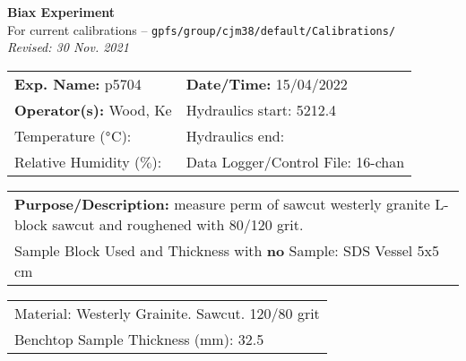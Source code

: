\documentclass[letterpaper, 10pt]{article}
\begin{document}
\begin{center}
    {\Large \textbf{Biax Experiment}}\\
    {\small For current calibrations -- \texttt{gpfs/group/cjm38/default/Calibrations/}}\\
    {\footnotesize \textit{Revised: 30 Nov. 2021}}
\end{center}



\begin{table}[!ht]
	\renewcommand{\arraystretch}{1.1}
	\begin{tabular}{p{10cm} p{10cm} }
	    \textbf{Exp. Name: }p5704 & \textbf{Date/Time: }15/04/2022\\
	    \textbf{Operator(s): }Wood, Ke & Hydraulics start: 5212.4 \\
	    Temperature ($\degree$C):  & Hydraulics end:  \\
	    Relative Humidity ($\%$):  & Data Logger/Control File: 16-chan \\
	\end{tabular}
\end{table} 
\vspace{-0.5cm} 

\begin{table}[!ht]
	\renewcommand{\arraystretch}{1.1}
	\begin{tabular}{p{20cm}}\textbf{Purpose/Description:} measure perm of sawcut westerly granite L-block sawcut and roughened with 80/120 grit.  \\Sample Block Used and Thickness with \textbf{no} Sample: SDS Vessel 5x5 cm \\
	\end{tabular}
    \end{table} \vspace{-0.5cm} 

\begin{table}[!ht]
        \small
        \renewcommand{\arraystretch}{1.2}
        \begin{tabular}{ |p{7cm}| } \hline 
Material: Westerly Grainite. Sawcut. 120/80 grit \\Benchtop Sample Thickness (mm): 32.5 \\ \hline \end{tabular} \end{table} \vspace{-0.5cm} 
\end{document}
